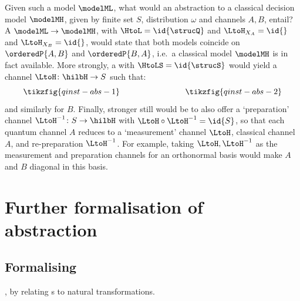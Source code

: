 \documentclass{article}
\begin{document}
{\begin{example}
Given such a model $\modelML$, what would an abstraction to a classical decision model $\modelMH$, given by finite set $S$, distribution $\omega$ and channels $A,B$, entail? A \qdown{} $\modelML \to \modelMH$, with $\HtoL =\id{\strucQ}$ and $\LtoH_{X_A}=\id{}$ and $\LtoH_{X_B} = \id{}$, would state that both models coincide on $\orderedP{A,B}$ and $\orderedP{B,A}$, i.e.~a classical model $\modelMH$ is in fact available. More strongly, a \strucdown{} with $\HtoLS = \id{\strucS}$ would yield a channel $\LtoH \colon \hilbH \to S$ such that:  
\[
\tikzfig{qinst-abs-1}
\qquad \qquad \qquad \qquad 
\tikzfig{qinst-abs-2}
\]
and similarly for $B$. Finally, stronger still would be to also offer a `preparation' channel $\LtoH^{-1} \colon S \to \hilbH$ with $\LtoH \circ \LtoH^{-1} = \id{S}$, so that each quantum channel $A$ reduces to a `measurement' channel $\LtoH$, classical channel $A$, and re-preparation $\LtoH^{-1}$.  
For example, taking $\LtoH, \LtoH^{-1}$ as the measurement and preparation channels for an orthonormal basis would make $A$ and $B$ diagonal in this basis. 
\end{example}


\section{Further formalisation of abstraction}
\label{app:further-formalisation}


\subsection{Formalising \qup{}} \label{app:up-abs}

, 
by relating \qup{}s to natural transformations. 


}
\end{document}
